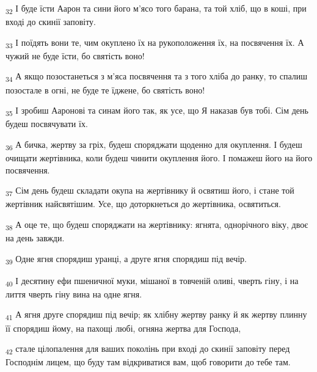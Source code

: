 \begin{tcolorbox}
\textsubscript{32} І буде їсти Аарон та сини його м'ясо того барана, та той хліб, що в коші, при вході до скинії заповіту.
\end{tcolorbox}
\begin{tcolorbox}
\textsubscript{33} І поїдять вони те, чим окуплено їх на рукоположення їх, на посвячення їх. А чужий не буде їсти, бо святість воно!
\end{tcolorbox}
\begin{tcolorbox}
\textsubscript{34} А якщо позостанеться з м'яса посвячення та з того хліба до ранку, то спалиш позостале в огні, не буде те їджене, бо святість воно!
\end{tcolorbox}
\begin{tcolorbox}
\textsubscript{35} І зробиш Ааронові та синам його так, як усе, що Я наказав був тобі. Сім день будеш посвячувати їх.
\end{tcolorbox}
\begin{tcolorbox}
\textsubscript{36} А бичка, жертву за гріх, будеш споряджати щоденно для окуплення. І будеш очищати жертівника, коли будеш чинити окуплення його. І помажеш його на його посвячення.
\end{tcolorbox}
\begin{tcolorbox}
\textsubscript{37} Сім день будеш складати окупа на жертівнику й освятиш його, і стане той жертівник найсвятішим. Усе, що доторкнеться до жертівника, освятиться.
\end{tcolorbox}
\begin{tcolorbox}
\textsubscript{38} А оце те, що будеш споряджати на жертівнику: ягнята, однорічного віку, двоє на день завжди.
\end{tcolorbox}
\begin{tcolorbox}
\textsubscript{39} Одне ягня спорядиш уранці, а друге ягня спорядиш під вечір.
\end{tcolorbox}
\begin{tcolorbox}
\textsubscript{40} І десятину ефи пшеничної муки, мішаної в товченій оливі, чверть гіну, і на лиття чверть гіну вина на одне ягня.
\end{tcolorbox}
\begin{tcolorbox}
\textsubscript{41} А ягня друге спорядиш під вечір; як хлібну жертву ранку й як жертву плинну її спорядиш йому, на пахощі любі, огняна жертва для Господа,
\end{tcolorbox}
\begin{tcolorbox}
\textsubscript{42} стале цілопалення для ваших поколінь при вході до скинії заповіту перед Господнім лицем, що буду там відкриватися вам, щоб говорити до тебе там.
\end{tcolorbox}
